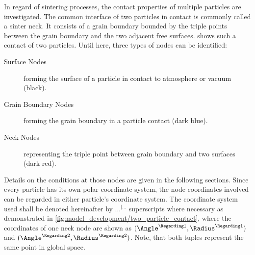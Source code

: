 In regard of sintering processes, the contact properties of multiple particles are investigated.
The common interface of two particles in contact is commonly called a sinter neck.
It consists of a grain boundary bounded by the triple points between the grain boundary and the two adjacent free surfaces.
 shows such a contact of two particles.
Until here, three types of nodes can be identified:
\begin{description}
    \item[Surface Nodes] forming the surface of a particle in contact to atmosphere or vacuum (black).
    \item[Grain Boundary Nodes] forming the grain boundary in a particle contact (dark blue).
    \item[Neck Nodes] representing the triple point between grain boundary and two surfaces (dark red).
\end{description}
Details on the conditions at those nodes are given in the following sections.
Since every particle has its own polar coordinate system, the node coordinates involved can be regarded in either particle's coordinate system.
The coordinate system used shall be denoted hereinafter by $\ldots^{|\ldots}$ superscripts where necessary as demonstrated in \cref{fig:model_development/two_particle_contact}, where the coordinates of one neck node are shown as $(\Angle^{\Regarding 1}, \Radius^{\Regarding 1})$ and $(\Angle^{\Regarding 2}, \Radius^{\Regarding 2})$.
Note, that both tuples represent the same point in global space.
